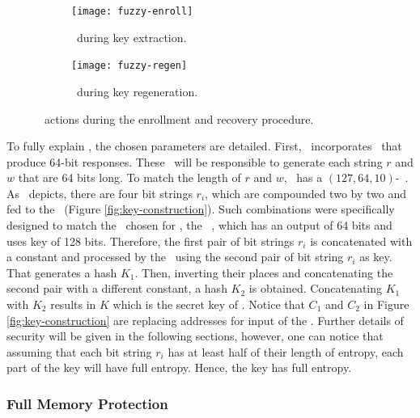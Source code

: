 \begin{figure}
     \centering
     \begin{subfigure}[b]{0.5\textwidth}
         \centering
         \texttt{[image: fuzzy-enroll]}
         \caption{\fuzzy~during key extraction.}
         \label{fig:fuzzy-enroll}
     \end{subfigure}
     \hfill
     \begin{subfigure}[b]{0.5\textwidth}
         \centering
         \texttt{[image: fuzzy-regen]}
         \caption{\fuzzy~during key regeneration.}
         \label{fig:fuzzy-regen}
     \end{subfigure}

        \caption{\fuzzy~actions during the enrollment and recovery procedure.}
        \label{fig:fuzzy-extractor}
\end{figure}

To fully explain \fenroll, the chosen parameters are detailed. First, \cshia~incorporates \pufs~that produce 64-bit responses. These \pufs~will be responsible to generate each string $r$ and $w$ that are 64 bits long. To match the length of $r$ and $w$, \cshia~has a $(127, 64, 10)$-\bch~\ecc. As \fenroll~depicts, there are four bit strings $r_i$, which are compounded two by two and fed to the \prf~(Figure \ref{fig:key-construction}). Such combinations were specifically designed to match the \prf~chosen for \cshia, the \siphash~\cite{Aumasson2012:SipHash}, which has an output of 64 bits and uses key of 128 bits. Therefore, the first pair of bit strings $r_i$ is concatenated with a constant and processed by the \prf~using the second pair of bit string $r_i$ as key. That generates a hash $K_1$. Then, inverting their places and concatenating the second pair with a different constant, a hash $K_2$ is obtained. Concatenating $K_1$ with $K_2$ results in $K$ which is the secret key of \cshia. Notice that $C_1$ and $C_2$ in Figure \ref{fig:key-construction} are replacing addresses for input of the \ptaggen. Further details of security will be given in the following sections, however, one can notice that assuming that each bit string $r_i$ has at least half of their length of entropy, each part of the key will have full entropy. Hence, the key has full entropy. 

\subsubsection{Full Memory Protection}
\label{subsubsec:Full-Memory-Protection}

